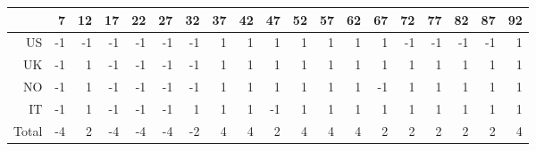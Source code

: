 \begin{table}[ht]
\centering
\begin{tabular}{rrrrrrrrrrrrrrrrrrr}
  \hline
 & 7 & 12 & 17 & 22 & 27 & 32 & 37 & 42 & 47 & 52 & 57 & 62 & 67 & 72 & 77 & 82 & 87 & 92 \\ 
  \hline
US & -1 & -1 & -1 & -1 & -1 & -1 & 1 & 1 & 1 & 1 & 1 & 1 & 1 & -1 & -1 & -1 & -1 & 1 \\ 
  UK & -1 & 1 & -1 & -1 & -1 & -1 & 1 & 1 & 1 & 1 & 1 & 1 & 1 & 1 & 1 & 1 & 1 & 1 \\ 
  NO & -1 & 1 & -1 & -1 & -1 & -1 & 1 & 1 & 1 & 1 & 1 & 1 & -1 & 1 & 1 & 1 & 1 & 1 \\ 
  IT & -1 & 1 & -1 & -1 & -1 & 1 & 1 & 1 & -1 & 1 & 1 & 1 & 1 & 1 & 1 & 1 & 1 & 1 \\ 
  Total & -4 & 2 & -4 & -4 & -4 & -2 & 4 & 4 & 2 & 4 & 4 & 4 & 2 & 2 & 2 & 2 & 2 & 4 \\ 
   \hline
\end{tabular}
\end{table}
